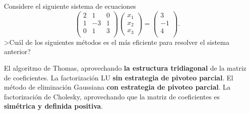 \begin{pregunta}
\begin{cuerpo}
Considere el siguiente sistema de ecuaciones
$$
\left(\begin{array}{rrr}
2&1&0\\
1&-3&1\\
0&1&3\\
\end{array}\right)
\left(\begin{array}{r}
x_1\\
x_2\\
x_3
\end{array}\right)
=
\left(\begin{array}{r}
3\\
-1\\
4\\
\end{array}\right).
$$
>Cu\'al de los siguientes m\'etodos es el m\'as eficiente para resolver el sistema anterior?
\end{cuerpo}
\begin{alternativas}
{El algoritmo de Thomas, aprovechando \textbf{la estructura tridiagonal} de la matriz de coeficientes.}
{La factorizaci\'on LU \textbf{sin estrategia de pivoteo parcial}.}
{El m\'etodo de eliminaci\'on Gaussiana \textbf{con estrategia de pivoteo parcial}.}
{La factorizaci\'on de Cholesky, aprovechando que la matriz de coeficientes es \textbf{sim\'etrica y definida positiva}.}
\end{alternativas}
\justificacion{0cm}
\end{pregunta}